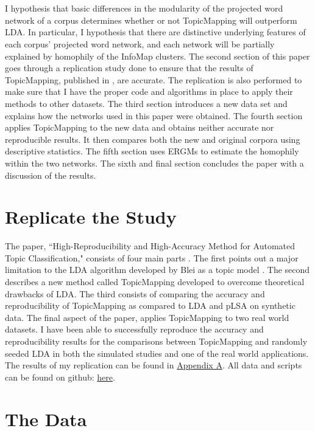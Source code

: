 \documentclass[12pt]{article}
\begin{document}
\\
\\
I hypothesis that basic differences in the modularity of the projected word network of a corpus determines whether or not TopicMapping will outperform LDA. In particular, I hypothesis that there are distinctive underlying features of each corpus' projected word network, and each network will be partially explained by homophily of the InfoMap clusters. The second section of this paper goes through a replication study done to ensure that the results of TopicMapping, published in \cite{main}, are accurate. The replication is also performed to make sure that I have the proper code and algorithms in place to apply their methods to other datasets. The third section introduces a new data set and explains how the networks used in this paper were obtained. The fourth section applies TopicMapping to the new data and obtains neither accurate nor reproducible results. It then compares both the new and original corpora using descriptive statistics. The fifth section uses ERGMs to estimate the homophily within the two networks. The sixth and final section concludes the paper with a discussion of the results.

\section{Replicate the Study}

The paper, ``High-Reproducibility and High-Accuracy Method for Automated Topic Classification," consists of four main parts \cite{main}. The first points out a major limitation to the LDA algorithm developed by Blei as a topic model \cite{lda}. The second describes a new method called TopicMapping developed to overcome theoretical drawbacks of LDA. The third consists of comparing the accuracy and reproducibility of TopicMapping as compared to LDA and pLSA \cite{plsa} on synthetic data. The final aspect of the paper, applies TopicMapping to two real world datasets. I have been able to successfully reproduce the accuracy and reproducibility results for the comparisons between TopicMapping and randomly seeded LDA in both the simulated studies and one of the real world applications. The results of my replication can be found in \hyperlink{A}{Appendix A}. All data and scripts can be found on github:   \href{https://github.com/cmcook22/Cook_Networks_Project}{here}.    

\section{The Data}
\end{document}
